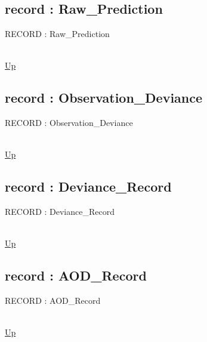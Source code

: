 \subsection*{record : Raw\_Prediction}
\hypertarget{ecldoc:logisticregression.types.raw_prediction}{RECORD : Raw\_Prediction} \\
\hyperlink{ecldoc:LogisticRegression.Types}{Up} \\
\par
\subsection*{record : Observation\_Deviance}
\hypertarget{ecldoc:logisticregression.types.observation_deviance}{RECORD : Observation\_Deviance} \\
\hyperlink{ecldoc:LogisticRegression.Types}{Up} \\
\par
\subsection*{record : Deviance\_Record}
\hypertarget{ecldoc:logisticregression.types.deviance_record}{RECORD : Deviance\_Record} \\
\hyperlink{ecldoc:LogisticRegression.Types}{Up} \\
\par
\subsection*{record : AOD\_Record}
\hypertarget{ecldoc:logisticregression.types.aod_record}{RECORD : AOD\_Record} \\
\hyperlink{ecldoc:LogisticRegression.Types}{Up} \\
\par

